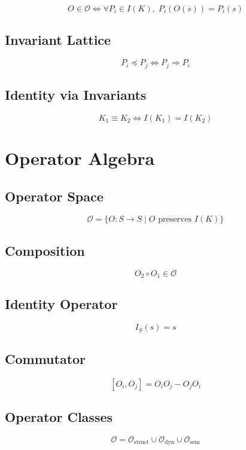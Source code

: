 \documentclass[12pt]{article}
\begin{document}
\[
O \in \mathcal{O} \iff \forall P_i \in I(K),\; P_i(O(s)) = P_i(s)
\]

\subsection{Invariant Lattice}

\[
P_i \preceq P_j \iff P_j \Rightarrow P_i
\]

\subsection{Identity via Invariants}

\[
K_1 \equiv K_2 \iff I(K_1) = I(K_2)
\]

\section{Operator Algebra}

\subsection{Operator Space}

\[
\mathcal{O} = \{O : S \to S \mid O \text{ preserves } I(K)\}
\]

\subsection{Composition}

\[
O_2 \circ O_1 \in \mathcal{O}
\]

\subsection{Identity Operator}

\[
I_S(s) = s
\]

\subsection{Commutator}

\[
[O_i, O_j] = O_i O_j - O_j O_i
\]

\subsection{Operator Classes}

\[
\mathcal{O} =
\mathcal{O}_{\mathrm{struct}} \cup
\mathcal{O}_{\mathrm{dyn}} \cup
\mathcal{O}_{\mathrm{sem}}
\]
\end{document}

